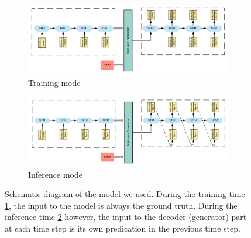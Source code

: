     \begin{figure}[htbp!]
        \centering
        \begin{subfigure}{1.0\textwidth}
            \centering
            \includegraphics[scale=0.6]{images/framework/training_mode.png}
            \caption{Training mode\label{fig:training_mode}}
        \end{subfigure}
        \begin{subfigure}{1.0\textwidth}
            \centering
            \includegraphics[scale=0.6]{images/framework/inference_mode.png}
            \caption{Inference mode\label{fig:inf_mode}}
        \end{subfigure}
        \caption{Schematic diagram of the model we used. During the training time \ref{fig:training_mode}, the input to the model is always the ground truth. During the inference time \ref{fig:inf_mode} however, the input to the decoder (generator) part at each time step is its own predication in the previous time step.}
        \label{fig:model_arch}
    \end{figure}


